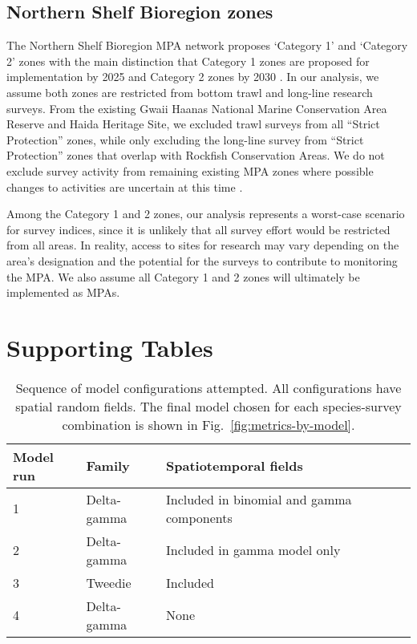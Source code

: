 \documentclass[12pt]{article}
\begin{document}
\subsection*{Northern Shelf Bioregion zones}

The Northern Shelf Bioregion MPA network proposes `Category 1' and `Category 2' zones with the main distinction that Category 1 zones are proposed for implementation by 2025 and Category 2 zones by 2030 \citep{dfo2022networkactionplan}.
In our analysis, we assume both zones are restricted from bottom trawl and long-line research surveys.
From the existing Gwaii Haanas National Marine Conservation Area Reserve and Haida Heritage Site, we excluded trawl surveys from all ``Strict Protection'' zones, while only excluding the long-line survey from ``Strict Protection'' zones that overlap with Rockfish Conservation Areas. We do not exclude survey activity from remaining existing MPA zones where possible changes to activities are uncertain at this time \citep{dfo2022networkactionplan}.

Among the Category 1 and 2 zones, our analysis represents a worst-case scenario for survey indices, since it is unlikely that all survey effort would be restricted from all areas.
In reality, access to sites for research may vary depending on the area's designation and the potential for the surveys to contribute to monitoring the MPA.
We also assume all Category 1 and 2 zones will ultimately be implemented as MPAs.

\clearpage

\section*{Supporting Tables}



\clearpage

\begin{table}[htpb]
\caption{Sequence of model configurations attempted. All configurations have
spatial random fields. The final model chosen for each species-survey combination is shown in Fig.~\ref{fig:metrics-by-model}.}
\centering
\begin{tabular}{lllll}
\toprule
Model run & Family & Spatiotemporal fields  \\
\midrule
1 & Delta-gamma & Included in binomial and gamma components  \\
2 & Delta-gamma & Included in gamma model only \\
3 & Tweedie & Included  \\
4 & Delta-gamma & None \\
\bottomrule
\end{tabular}
\label{tab:model-configs}
\end{table}
\end{document}
